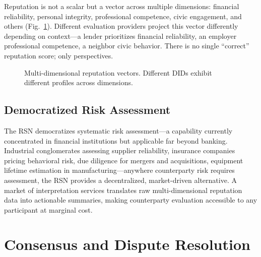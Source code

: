 \documentclass[11pt,a4paper,twocolumn]{article}
\begin{document}
Reputation is not a scalar but a vector across multiple dimensions: financial reliability, personal integrity, professional competence, civic engagement, and others (Fig.~\ref{fig:reputation-radar}). Different evaluation providers project this vector differently depending on context---a lender prioritizes financial reliability, an employer professional competence, a neighbor civic behavior. There is no single ``correct'' reputation score; only perspectives.

\begin{figure}[ht]
\centering
{}
\caption{Multi-dimensional reputation vectors. Different DIDs exhibit different profiles across dimensions.}
\label{fig:reputation-radar}
\end{figure}

\subsection{Democratized Risk Assessment}

The RSN democratizes systematic risk assessment---a capability currently concentrated in financial institutions but applicable far beyond banking. Industrial conglomerates assessing supplier reliability, insurance companies pricing behavioral risk, due diligence for mergers and acquisitions, equipment lifetime estimation in manufacturing---anywhere counterparty risk requires assessment, the RSN provides a decentralized, market-driven alternative. A market of interpretation services translates raw multi-dimensional reputation data into actionable summaries, making counterparty evaluation accessible to any participant at marginal cost.

\section{Consensus and Dispute Resolution}
\end{document}
